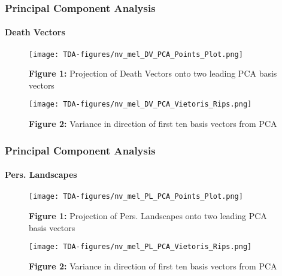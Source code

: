 \documentclass[aspectratio=169]{beamer}
\begin{document}
\begin{frame}
\frametitle{Principal Component Analysis} \framesubtitle{Death Vectors}

\begin{figure}[H]
\centering
\begin{minipage}{.45\textwidth}
  \centering
  \texttt{[image: TDA-figures/nv\_mel\_DV\_PCA\_Points\_Plot.png]}
  \caption{{\bfseries \textcolor{UF_dark_blue}{Figure 1:}} Projection of Death Vectors onto two leading PCA basis vectors}
\end{minipage}\hspace{10mm} %
\begin{minipage}{.45\textwidth}
  \centering
  \texttt{[image: TDA-figures/nv\_mel\_DV\_PCA\_Vietoris\_Rips.png]}
  \caption{{\bfseries \textcolor{UF_dark_blue}{Figure 2:}} Variance in direction of first ten basis vectors from PCA}
\end{minipage}
\end{figure}

\end{frame}


\begin{frame}
\frametitle{Principal Component Analysis} \framesubtitle{Pers. Landscapes}

\begin{figure}[H]
\centering
\begin{minipage}{.45\textwidth}
  \centering
  \texttt{[image: TDA-figures/nv\_mel\_PL\_PCA\_Points\_Plot.png]}
  \caption{{\bfseries \textcolor{UF_dark_blue}{Figure 1:}} Projection of Pers. Landscapes onto two leading PCA basis vectors}
\end{minipage}\hspace{10mm} %
\begin{minipage}{.45\textwidth}
  \centering
  \texttt{[image: TDA-figures/nv\_mel\_PL\_PCA\_Vietoris\_Rips.png]}
  \caption{{\bfseries \textcolor{UF_dark_blue}{Figure 2:}} Variance in direction of first ten basis vectors from PCA}
\end{minipage}
\end{figure}

\end{frame}
\end{document}
